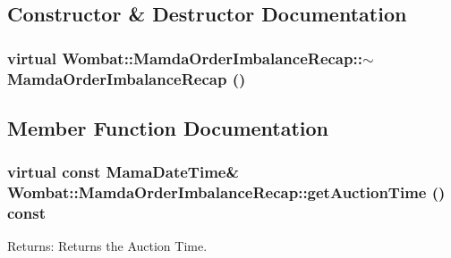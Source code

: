 \subsection{Constructor \& Destructor Documentation}
\hypertarget{classWombat_1_1MamdaOrderImbalanceRecap_9a42dd7d74c4989c4f0b0290649f026b}{
\subsubsection[$\sim$MamdaOrderImbalanceRecap]{\setlength{\rightskip}{0pt plus 5cm}virtual Wombat::Mamda\-Order\-Imbalance\-Recap::$\sim$Mamda\-Order\-Imbalance\-Recap ()}}
\label{classWombat_1_1MamdaOrderImbalanceRecap_9a42dd7d74c4989c4f0b0290649f026b}




\subsection{Member Function Documentation}
\hypertarget{classWombat_1_1MamdaOrderImbalanceRecap_55fb46c69e5aff98475169a4ddbb4ae6}{
\subsubsection[getAuctionTime]{\setlength{\rightskip}{0pt plus 5cm}virtual const Mama\-Date\-Time\& Wombat::Mamda\-Order\-Imbalance\-Recap::get\-Auction\-Time () const}}
\label{classWombat_1_1MamdaOrderImbalanceRecap_55fb46c69e5aff98475169a4ddbb4ae6}


\begin{Desc}
\item[Returns:]Returns the Auction Time. \end{Desc}


